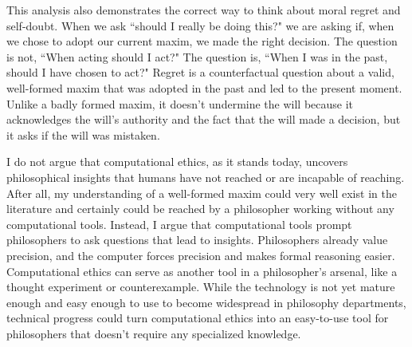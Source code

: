 \begin{isabellebody}
\begin{isamarkuptext}
This analysis also demonstrates the correct way to think about moral regret and self-doubt. When we 
ask ``should I really be doing this?" we are asking if, when we chose to adopt our current maxim, 
we made the right decision. The question is not, ``When acting should I act?" The question is, ``When 
I was in the past, should I have chosen to act?" Regret is a counterfactual question about a valid, 
well-formed maxim that was adopted in the past and led to the present moment. Unlike a badly formed 
maxim, it doesn't undermine the will because it acknowledges the will's authority and the fact that the 
will made a decision, but it asks if the will was mistaken.%
\end{isamarkuptext}\isamarkuptrue%
%
\isadelimdocument
%
\endisadelimdocument
%
\isatagdocument
%
\isamarkuptrue%
%
\endisatagdocument
{\isafolddocument}%
%
\isadelimdocument
%
\endisadelimdocument
%
\begin{isamarkuptext}%
I do not argue that computational ethics, as it stands today, uncovers philosophical insights that humans have not reached 
or are incapable of reaching. After all, my understanding of a well-formed maxim could 
very well exist in the literature and certainly could be reached by a philosopher working without any 
computational tools. Instead, I argue that computational tools prompt philosophers to ask questions that 
lead to insights. Philosophers already value precision, and the computer forces precision and makes formal
reasoning easier. Computational 
ethics can serve as another tool in a philosopher's arsenal, like a thought experiment or counterexample.
While the technology is not yet mature enough and easy enough to use to become widespread in philosophy
departments, technical progress could turn computational ethics into an easy-to-use tool for philosophers
that doesn't require any specialized knowledge.


\end{isamarkuptext}
\end{isabellebody}
